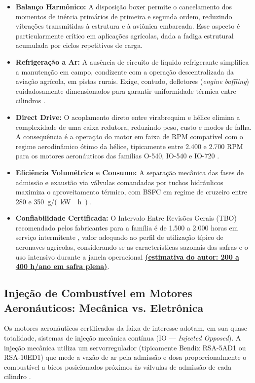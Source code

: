 \documentclass[a4paper,12pt]{article}
\newcommand{\autoeval}[1]{\textbf{\underline{#1}}}
\begin{document}
\begin{itemize}
    \item \textbf{Balanço Harmônico:} A disposição boxer permite o cancelamento dos momentos de inércia primários de primeira e segunda ordem, reduzindo vibrações transmitidas à estrutura e à aviônica embarcada. Esse aspecto é particularmente crítico em aplicações agrícolas, dada a fadiga estrutural acumulada por ciclos repetitivos de carga.
    \item \textbf{Refrigeração a Ar:} A ausência de circuito de líquido refrigerante simplifica a manutenção em campo, condizente com a operação descentralizada da aviação agrícola, em pistas rurais. Exige, contudo, defletores (\textit{engine baffling}) cuidadosamente dimensionados para garantir uniformidade térmica entre cilindros \cite{lycomingmanual, io360manual}.
    \item \textbf{Direct Drive:} O acoplamento direto entre virabrequim e hélice elimina a complexidade de uma caixa redutora, reduzindo peso, custo e modos de falha. A consequência é a operação do motor em faixa de RPM compatível com o regime aerodinâmico ótimo da hélice, tipicamente entre 2.400 e 2.700 RPM para os motores aeronáuticos das famílias O-540, IO-540 e IO-720 \cite{lycomingmanual, lycoming_io720}.
    \item \textbf{Eficiência Volumétrica e Consumo:} A separação mecânica das fases de admissão e exaustão via válvulas comandadas por tuchos hidráulicos maximiza o aproveitamento térmico, com BSFC em regime de cruzeiro entre 280 e \SI{350}{g/(kW \cdot h)} \cite{lycomingmanual, io360manual}.
    \item \textbf{Confiabilidade Certificada:} O Intervalo Entre Revisões Gerais (TBO) recomendado pelos fabricantes para a família é de 1.500 a 2.000 horas em serviço intermitente \cite{lycomingmanual}, valor adequado ao perfil de utilização típico de aeronaves agrícolas, considerando-se as características sazonais das safras e o uso intensivo durante a janela operacional \autoeval{(estimativa do autor: 200 a 400 h/ano em safra plena)}.
\end{itemize}

\subsection{Injeção de Combustível em Motores Aeronáuticos: Mecânica vs. Eletrônica}

Os motores aeronáuticos certificados da faixa de interesse adotam, em sua quase totalidade, sistemas de injeção mecânica contínua (IO --- \textit{Injected Opposed}). A injeção mecânica utiliza um servorregulador (tipicamente Bendix RSA-5AD1 ou RSA-10ED1) que mede a vazão de ar pela admissão e dosa proporcionalmente o combustível a bicos posicionados próximos às válvulas de admissão de cada cilindro \cite{io360manual}.
\end{document}
